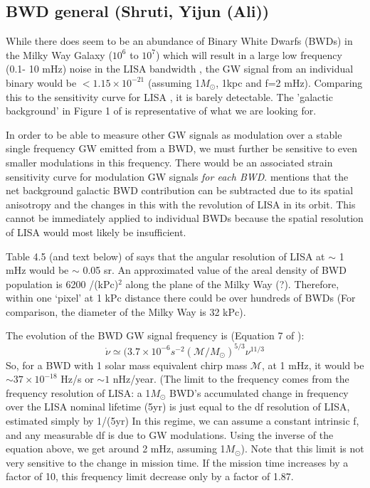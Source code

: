\documentclass{article}
\begin{document}
\subsection{\label{BWDgeneral}BWD general (Shruti, Yijun (Ali))}
While there does seem to be an abundance of Binary White Dwarfs (BWDs) in the Milky Way Galaxy ($10^{6}$ to $10^{7}$)  which will result in a large low frequency (0.1- 10 mHz) noise in the LISA bandwidth \cite{Farmer2003}, the GW signal from an individual binary would be $<1.15 \times 10^{-21}$  \cite{Lamberts2019} (assuming 1$M_\odot$, 1kpc and f=2 mHz). Comparing this to the sensitivity curve for LISA \cite{Hobson2018}, it is barely detectable. The 'galactic background' in Figure 1 of \cite{Hobbs2010} is representative of what we are looking for.

In order to be able to measure other GW signals as modulation over a stable single frequency GW emitted from a BWD, we must further be sensitive to even smaller modulations in this frequency. There would be an associated strain sensitivity curve for modulation GW signals \textit{for each BWD}. 
\cite{Farmer2003} mentions that the net background galactic BWD contribution can be subtracted due to its spatial anisotropy and the changes in this with the revolution of LISA in its orbit. This cannot be immediately applied to individual BWDs because the spatial resolution of LISA would most likely be insufficient.

Table 4.5 (and text below) of \cite{LISA1998} says that the angular resolution of LISA at $\sim$ 1 mHz would be $\sim$ 0.05 sr. An approximated value of the areal density of BWD population is 6200 /(kPc)$^2$ along the plane of the Milky Way (?). Therefore, within one `pixel' at 1 kPc distance there could be over hundreds of BWDs (For comparison, the diameter of the Milky Way is 32 kPc).

The evolution of the BWD GW signal frequency is (Equation 7 of \cite{Farmer2003}):
\begin{equation}\label{BWDfevol}
    \dot{\nu} \simeq (3.7 \times 10^{-6} s^{-2} (\mathcal{M}/M_{\odot})^{5/3}\nu^{11/3}
\end{equation}
So, for a BWD with 1 solar mass equivalent chirp mass $\mathcal{M}$, at 1 mHz, it would be $\sim37 \times 10^{-18}$  Hz/s or $\sim1$ nHz/year. (The limit to the frequency comes from the frequency resolution of LISA: a 1$M_\odot$ BWD's accumulated change in frequency over the LISA nominal lifetime (5yr) is just equal to the df resolution of LISA, estimated simply by 1/(5yr) In this regime, we can assume a constant intrinsic f, and any measurable df is due to GW modulations. Using the inverse of the equation above, we get around 2 mHz, assuming 1$M_\odot$). Note that this limit is not very sensitive to the change in mission time. If the mission time increases by a factor of 10, this frequency limit decrease only by a factor of 1.87.
\end{document}
